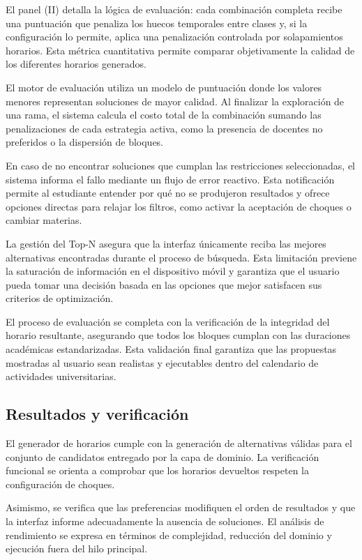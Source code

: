 El panel (II) detalla la lógica de evaluación: cada combinación completa recibe una puntuación que penaliza los huecos temporales entre clases y, si la configuración lo permite, aplica una penalización controlada por solapamientos horarios. Esta métrica cuantitativa permite comparar objetivamente la calidad de los diferentes horarios generados.

El motor de evaluación utiliza un modelo de puntuación donde los valores menores representan soluciones de mayor calidad. Al finalizar la exploración de una rama, el sistema calcula el costo total de la combinación sumando las penalizaciones de cada estrategia activa, como la presencia de docentes no preferidos o la dispersión de bloques.

En caso de no encontrar soluciones que cumplan las restricciones seleccionadas, el sistema informa el fallo mediante un flujo de error reactivo. Esta notificación permite al estudiante entender por qué no se produjeron resultados y ofrece opciones directas para relajar los filtros, como activar la aceptación de choques o cambiar materias.

La gestión del Top-N asegura que la interfaz únicamente reciba las mejores alternativas encontradas durante el proceso de búsqueda. Esta limitación previene la saturación de información en el dispositivo móvil y garantiza que el usuario pueda tomar una decisión basada en las opciones que mejor satisfacen sus criterios de optimización.

El proceso de evaluación se completa con la verificación de la integridad del horario resultante, asegurando que todos los bloques cumplan con las duraciones académicas estandarizadas. Esta validación final garantiza que las propuestas mostradas al usuario sean realistas y ejecutables dentro del calendario de actividades universitarias.

\subsection{Resultados y verificación}
El generador de horarios cumple con la generación de alternativas válidas para el conjunto de candidatos entregado por la capa de dominio. La verificación funcional se orienta a comprobar que los horarios devueltos respeten la configuración de choques.

Asimismo, se verifica que las preferencias modifiquen el orden de resultados y que la interfaz informe adecuadamente la ausencia de soluciones. El análisis de rendimiento se expresa en términos de complejidad, reducción del dominio y ejecución fuera del hilo principal.

